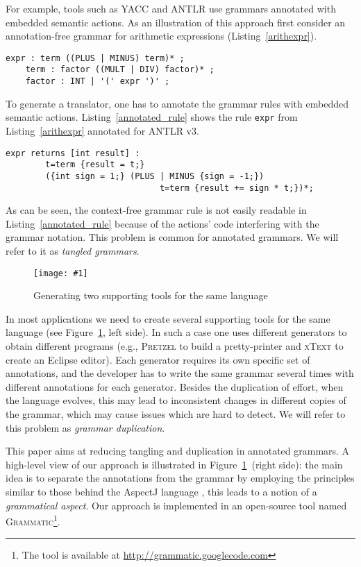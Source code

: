 \documentclass{IOS-Book-Article}     %
\newcommand{\fig}[2]{%
\begin{figure}%
\centering%
\texttt{[image: \#1]}%
\caption{#2}\label{#1}%
\end{figure}%
}
\newcommand{\lstref}[1]{Listing~\ref{#1}}
\newcommand{\figref}[1]{Figure~\ref{#1}}
\newcommand{\tool}[1]{\textsc{#1}}
\newcommand{\Grammatic}[0]{\tool{Grammatic}}
\begin{document}
For example, tools such as \tool{YACC} \cite{YACC} and \tool{ANTLR} \cite{ANTLR} use grammars annotated with embedded semantic actions. As an illustration of this approach first consider an annotation-free grammar for arithmetic expressions (\lstref{arithexpr}).
\begin{lstlisting}[language=Grammatic,label=arithexpr,caption=Grammar for arithmetic expressions,float]
    expr : term ((PLUS | MINUS) term)* ;
    term : factor ((MULT | DIV) factor)* ;
    factor : INT | '(' expr ')' ;
\end{lstlisting}
To generate a translator, one has to annotate the grammar rules with embedded semantic actions. \lstref{annotated_rule} shows the rule \texttt{expr} from \lstref{arithexpr} annotated for \tool{ANTLR} v3.
\begin{lstlisting}[caption=Annotated grammar rule,label=annotated_rule,float]
    expr returns [int result] : 
        t=term {result = t;} 
        ({int sign = 1;} (PLUS | MINUS {sign = -1;}) 
                               t=term {result += sign * t;})*;
\end{lstlisting}

As can be seen, the context-free grammar rule is not easily readable in \lstref{annotated_rule} because of the actions' code interfering with the grammar notation. This problem is common for annotated grammars. We will refer to it as \emph{tangled grammars}.

\fig{problems_and_solution}{Generating two supporting tools for the same language}
In most applications we need to create several supporting tools for the same language (see \figref{problems_and_solution}, left side). 
In such a case one uses different generators to obtain different programs (e.g., \tool{Pretzel} \cite{Pretzel} to build a pretty-printer and \tool{xText} \cite{Xtext} to create an Eclipse editor). Each generator requires its own specific set of annotations, and the developer has to write the same grammar several times with different annotations for each generator. Besides the duplication of effort, when the language evolves, this may lead to inconsistent changes in different copies of the grammar, which may cause issues which are hard to detect. We will refer to this problem as \emph{grammar duplication}.

This paper aims at reducing tangling and duplication in annotated grammars. 
A high-level view of our approach is illustrated in \figref{problems_and_solution}~(right side): the main idea is to separate the annotations from the grammar by employing the principles similar to those behind the AspectJ language \cite{AspectJ}, this leads to a notion of a \emph{grammatical aspect}. Our approach is implemented in an open-source tool named \Grammatic{}\footnote{The tool is available at \url{http://grammatic.googlecode.com}}. 
\end{document}
